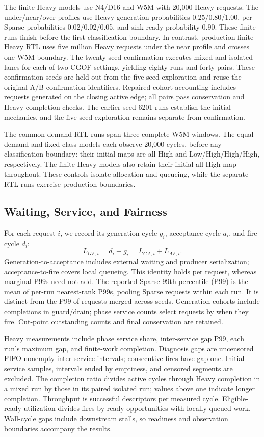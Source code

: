 The finite-Heavy models use N4/D16 and W5M with 20,000 Heavy requests. The under/near/over profiles use Heavy generation probabilities 0.25/0.80/1.00, per-Sparse probabilities 0.02/0.02/0.05, and sink-ready probability 0.90. These finite runs finish before the first classification boundary. In contrast, production finite-Heavy RTL uses five million Heavy requests under the near profile and crosses one W5M boundary. The twenty-seed confirmation executes mixed and isolated lanes for each of two CGOF settings, yielding eighty runs and forty pairs. These confirmation seeds are held out from the five-seed exploration and reuse the original A/B confirmation identifiers. Repaired cohort accounting includes requests generated on the closing active edge; all pairs pass conservation and Heavy-completion checks. The earlier seed-6201 runs establish the initial mechanics, and the five-seed exploration remains separate from confirmation.

The common-demand RTL runs span three complete W5M windows. The equal-demand and fixed-class models each observe 20,000 cycles, before any classification boundary: their initial maps are all High and Low/High/High/High, respectively. The finite-Heavy models also retain their initial all-High map throughout. These controls isolate allocation and queueing, while the separate RTL runs exercise production boundaries.

\subsection{Waiting, Service, and Fairness}
For each request $i$, we record its generation cycle $g_i$, acceptance cycle $a_i$, and fire cycle $d_i$:
\begin{equation}
L_{GF,i}=d_i-g_i=L_{GA,i}+L_{AF,i}.
\label{eq:latency-v3}
\end{equation}
Generation-to-acceptance includes external waiting and producer serialization; acceptance-to-fire covers local queueing. This identity holds per request, whereas marginal P99s need not add. The reported Sparse 99th percentile (P99) is the mean of per-run nearest-rank P99s, pooling Sparse requests within each run. It is distinct from the P99 of requests merged across seeds. Generation cohorts include completions in guard/drain; phase service counts select requests by when they fire. Cut-point outstanding counts and final conservation are retained.

Heavy measurements include phase service share, inter-service gap P99, each run's maximum gap, and finite-work completion. Diagnosis gaps are uncensored FIFO-nonempty inter-service intervals; consecutive fires have gap one. Initial-service samples, intervals ended by emptiness, and censored segments are excluded. The completion ratio divides active cycles through Heavy completion in a mixed run by those in its paired isolated run; values above one indicate longer completion. Throughput is successful descriptors per measured cycle. Eligible-ready utilization divides fires by ready opportunities with locally queued work. Wall-cycle gaps include downstream stalls, so readiness and observation boundaries accompany the results.

